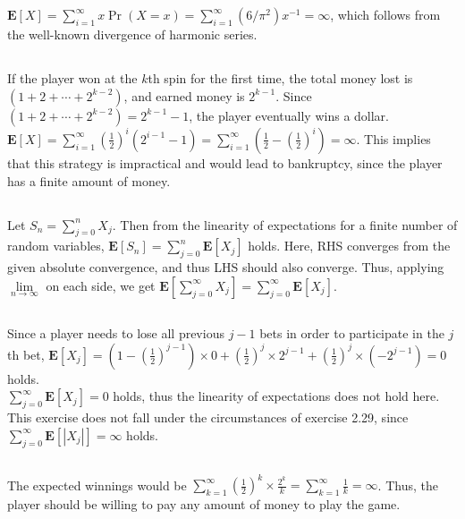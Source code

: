 \documentclass{article}
\begin{document}
\subsection{}
$\textbf{E}[X]=\sum\limits_{i=1}^\infty x\Pr(X=x)=\sum\limits_{i=1}^\infty(6/\pi^2)x^{-1}=\infty$,
which follows from the well-known divergence of harmonic series.
\subsection{}
If the player won at the $k$th spin for the first time, the total money lost is $(1+2+\cdots+2^{k-2})$, and earned money is $2^{k-1}$.
Since $(1+2+\cdots+2^{k-2})=2^{k-1}-1$, the player eventually wins a dollar.\\
$\textbf{E}[X]=\sum\limits_{i=1}^\infty(\frac{1}{2})^i(2^{i-1}-1)=\sum\limits_{i=1}^\infty(\frac{1}{2}-(\frac{1}{2})^i)=\infty$.
This implies that this strategy is impractical and would lead to bankruptcy, since the player has a finite amount of money.
\subsection{}
Let $S_n=\sum\limits_{j=0}^nX_j$.
Then from the linearity of expectations for a finite number of random variables, $\textbf{E}[S_n]=\sum\limits_{j=0}^n\textbf{E}[X_j]$ holds.
Here, RHS converges from the given absolute convergence, and thus LHS should also converge.
Thus, applying $\lim\limits_{n\rightarrow\infty}$ on each side, we get $\textbf{E}[\sum\limits_{j=0}^\infty X_j]=\sum\limits_{j=0}^\infty\textbf{E}[X_j]$.
\subsection{}
Since a player needs to lose all previous $j-1$ bets in order to participate in the $j$th bet,
$\textbf{E}[X_j]=(1-(\frac{1}{2})^{j-1}) \times 0 + (\frac{1}{2})^j\times2^{j-1} + (\frac{1}{2})^j\times(-2^{j-1})=0$ holds.\\
$\sum\limits_{j=0}^\infty \textbf{E}[X_j]=0$ holds, thus the linearity of expectations does not hold here.\\
This exercise does not fall under the circumstances of exercise 2.29, since $\sum\limits_{j=0}^\infty\textbf{E}[|X_j|]=\infty$ holds.
\subsection{}
The expected winnings would be $\sum\limits_{k=1}^\infty(\frac{1}{2})^k \times \frac{2^k}{k} = \sum\limits_{k=1}^\infty \frac{1}{k} = \infty$. Thus, the player should be willing to pay any amount of money to play the game.
\end{document}
